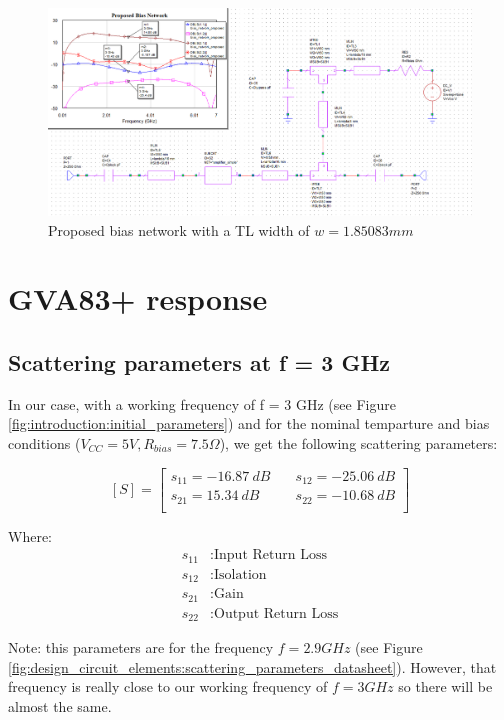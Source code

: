 \documentclass[12pt]{report} %
\let\oldsection\section
\renewcommand\section{\clearpage\oldsection}
\begin{document}
\begin{figure}[htbp]
    \centering
    \includegraphics[width=1\linewidth]{images//design_circuit_elements/gva83+_bias_transmission_line_low_z_0.png}
    \caption{Proposed bias network with a TL width of $w = 1.85083 mm$}
    \label{fig:design_circuit_elements:gva83+_bias_transmission_line_low_z_0}
\end{figure}

\section{GVA83+ response}
 
\subsection{Scattering parameters at f = 3 GHz}

In our case, with a working frequency of f = 3 GHz (see Figure \ref{fig:introduction:initial_parameters}) and for the nominal temparture and bias conditions ($V_{CC} = 5V, R_{bias} = 7.5 \Omega$), we get the following scattering parameters:

\[
[S] = \begin{bmatrix}
s_{11} = -16.87 \ dB & \quad s_{12} = -25.06 \ dB \\
s_{21} = 15.34 \ dB & \quad s_{22} = -10.68 \ dB \\
\end{bmatrix}
\]

Where:
\begin{align*}
s_{11} & : \text{Input Return Loss} \\
s_{12} & : \text{Isolation} \\
s_{21} & : \text{Gain} \\
s_{22} & : \text{Output Return Loss}
\end{align*}

Note: this parameters are for the frequency $f = 2.9 GHz$ (see Figure \ref{fig:design_circuit_elements:scattering_parameters_datasheet}). However, that frequency is really close to our working frequency of $f = 3 GHz$ so there will be almost the same.
\end{document}
